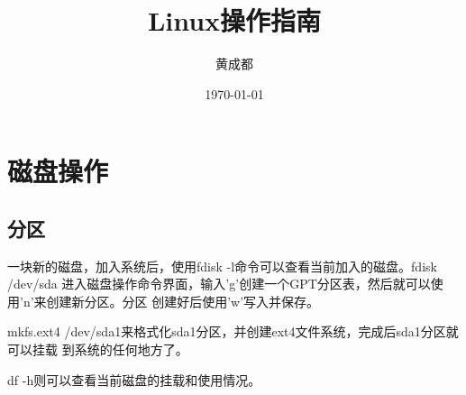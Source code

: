 \documentclass[a4paper, 11pt]{article}
\title{\heiti Linux操作指南}
\author{\kaishu 黄成都}
\date{\today}
\begin{document}
    \maketitle
    \thispagestyle{empty}
    
    \newpage
    \tableofcontents
    \thispagestyle{empty}

    \newpage
    \setcounter{page}{1}
    \section{磁盘操作}
    \subsection{分区}
        一块新的磁盘，加入系统后，使用fdisk -l命令可以查看当前加入的磁盘。fdisk /dev/sda
        进入磁盘操作命令界面，输入'g'创建一个GPT分区表，然后就可以使用'n'来创建新分区。分区
        创建好后使用'w'写入并保存。

        mkfs.ext4 /dev/sda1来格式化sda1分区，并创建ext4文件系统，完成后sda1分区就可以挂载
        到系统的任何地方了。

        df -h则可以查看当前磁盘的挂载和使用情况。


\end{document}
